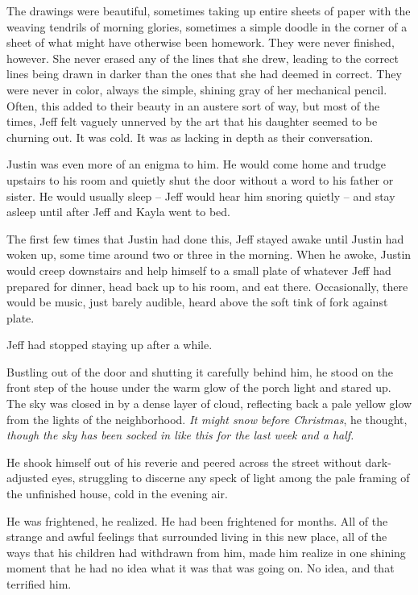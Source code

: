 The drawings were beautiful, sometimes taking up entire sheets of paper with the weaving tendrils of morning glories, sometimes a simple doodle in the corner of a sheet of what might have otherwise been homework.  They were never finished, however.  She never erased any of the lines that she drew, leading to the correct lines being drawn in darker than the ones that she had deemed in correct.  They were never in color, always the simple, shining gray of her mechanical pencil.  Often, this added to their beauty in an austere sort of way, but most of the times, Jeff felt vaguely unnerved by the art that his daughter seemed to be churning out.  It was cold.  It was as lacking in depth as their conversation.

Justin was even more of an enigma to him.  He would come home and trudge upstairs to his room and quietly shut the door without a word to his father or sister.  He would usually sleep -- Jeff would hear him snoring quietly -- and stay asleep until after Jeff and Kayla went to bed.

The first few times that Justin had done this, Jeff stayed awake until Justin had woken up, some time around two or three in the morning.  When he awoke, Justin would creep downstairs and help himself to a small plate of whatever Jeff had prepared for dinner, head back up to his room, and eat there.  Occasionally, there would be music, just barely audible, heard above the soft tink of fork against plate.

Jeff had stopped staying up after a while.

\secdiv


Bustling out of the door and shutting it carefully behind him, he stood on the front step of the house under the warm glow of the porch light and stared up.  The sky was closed in by a dense layer of cloud, reflecting back a pale yellow glow from the lights of the neighborhood.  \textit{It might snow before Christmas}, he thought, \textit{though the sky has been socked in like this for the last week and a half.}

He shook himself out of his reverie and peered across the street without dark-adjusted eyes, struggling to discerne any speck of light among the pale framing of the unfinished house, cold in the evening air.

He was frightened, he realized.  He had been frightened for months.  All of the strange and awful feelings that surrounded living in this new place, all of the ways that his children had withdrawn from him, made him realize in one shining moment that he had no idea what it was that was going on.  No idea, and that terrified him.

